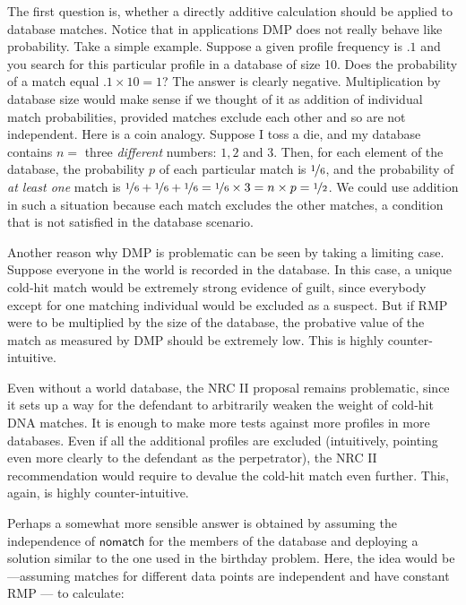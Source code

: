\documentclass[10pt,dvipsnames,enabledeprecatedfontcommands]{scrartcl}
\begin{document}
The first question is, whether a directly additive calculation should be
applied to database matches. Notice that in applications DMP does not
really behave like probability. Take a simple example. Suppose a given
profile frequency is \(.1\) and you search for this particular profile
in a database of size 10. Does the probability of a match equal
\(.1 \times 10=1\)? The answer is clearly negative. Multiplication by
database size would make sense if we thought of it as addition of
individual match probabilities, provided matches exclude each other and
so are not independent. Here is a coin analogy. Suppose I toss a die,
and my database contains \(n=\) three \emph{different} numbers: \(1, 2\)
and \(3\). Then, for each element of the database, the probability \(p\)
of each particular match is \(\nicefrac{1}{6}\), and the probability of
\emph{at least one} match is
\(\nicefrac{1}{6}+\nicefrac{1}{6}+\nicefrac{1}{6}=\nicefrac{1}{6}\times 3 = n\times p =\nicefrac{1}{2}\).
We could use addition in such a situation because each match excludes
the other matches, a condition that is not satisfied in the database
scenario.

Another reason why DMP is problematic can be seen by taking a limiting
case. Suppose everyone in the world is recorded in the database. In this
case, a unique cold-hit match would be extremely strong evidence of
guilt, since everybody except for one matching individual would be
excluded as a suspect. But if RMP were to be multiplied by the size of
the database, the probative value of the match as measured by DMP should
be extremely low. This is highly counter-intuitive.

Even without a world database, the NRC II proposal remains problematic,
since it sets up a way for the defendant to arbitrarily weaken the
weight of cold-hit DNA matches. It is enough to make more tests against
more profiles in more databases. Even if all the additional profiles are
excluded (intuitively, pointing even more clearly to the defendant as
the perpetrator), the NRC II recommendation would require to devalue the
cold-hit match even further. This, again, is highly counter-intuitive.

Perhaps a somewhat more sensible answer is obtained by assuming the
independence of \(\mathsf{no match}\) for the members of the database
and deploying a solution similar to the one used in the birthday
problem. Here, the idea would be---assuming matches for different data
points are independent and have constant RMP --- to calculate:
\end{document}
